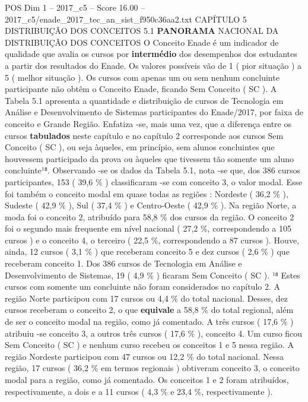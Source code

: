 \begin{textsample}{POS Dim 1 – 2017\_c5 – Score 16.00 – 2017\_c5/enade\_2017\_tec\_an\_sist\_f950c36aa2.txt}  \label{ex:f1_pos_055}
CAPÍTULO 5 DISTRIBUIÇÃO DOS CONCEITOS 5.1 \textbf{PANORAMA} NACIONAL DA DISTRIBUIÇÃO DOS CONCEITOS O Conceito Enade é um indicador de qualidade que avalia os cursos por \textbf{intermédio} dos desempenhos dos estudantes a partir dos resultados do Enade.
Os valores possíveis vão de 1 ( pior situação ) a 5 ( melhor situação ).
Os cursos com apenas um ou sem nenhum concluinte participante não obtêm o Conceito Enade, ficando Sem Conceito ( SC ).
A Tabela 5.1 apresenta a quantidade e distribuição de cursos de Tecnologia em Análise e Desenvolvimento de Sistemas participantes do Enade/2017, por faixa de conceito e Grande Região.
Enfatiza -se, mais uma vez, que a diferença entre os cursos \textbf{tabulados} neste capítulo e no capítulo 2 corresponde aos cursos Sem Conceito ( SC ), ou seja àqueles, em princípio, sem alunos concluintes que houvessem participado da prova ou àqueles que tivessem tão somente um aluno concluinte¹⁸.
Observando -se os dados da Tabela 5.1, nota -se que, dos 386 cursos participantes, 153 ( 39,6 \% ) classificaram -se com conceito 3, o valor modal.
Esse foi também o conceito modal em quase todas as regiões : Nordeste ( 36,2 \% ), Sudeste ( 42,9 \% ), Sul ( 37,4 \% ) e Centro-Oeste ( 42,9 \% ).
Na região Norte, a moda foi o conceito 2, atribuído para 58,8 \% dos cursos da região.
O conceito 2 foi o segundo mais frequente em nível nacional ( 27,2 \%, correspondendo a 105 cursos ) e o conceito 4, o terceiro ( 22,5 \%, correspondendo a 87 cursos ).
Houve, ainda, 12 cursos ( 3,1 \% ) que receberam conceito 5 e dez cursos ( 2,6 \% ) que receberam conceito 1.
Dos 386 cursos de Tecnologia em Análise e Desenvolvimento de Sistemas, 19 ( 4,9 \% ) ficaram Sem Conceito ( SC ). ¹⁸ Estes cursos com somente um concluinte não foram considerados no capítulo 2.
A região Norte participou com 17 cursos ou 4,4 \% do total nacional.
Desses, dez cursos receberam o conceito 2, o que \textbf{equivale} a 58,8 \% do total regional, além de ser o conceito modal na região, como já comentado.
A três cursos ( 17,6 \% ) atribuiu -se conceito 3, a outros três cursos ( 17,6 \% ), conceito 4.
Um curso ficou Sem Conceito ( SC ) e nenhum curso recebeu os conceitos 1 e 5 nessa região.
A região Nordeste participou com 47 cursos ou 12,2 \% do total nacional.
Nessa região, 17 cursos ( 36,2 \% em termos regionais ) obtiveram conceito 3, o conceito modal para a região, como já comentado.
Os conceitos 1 e 2 foram atribuídos, respectivamente, a dois e a 11 cursos ( 4,3 \% e 23,4 \%, respectivamente ).

\end{textsample}
